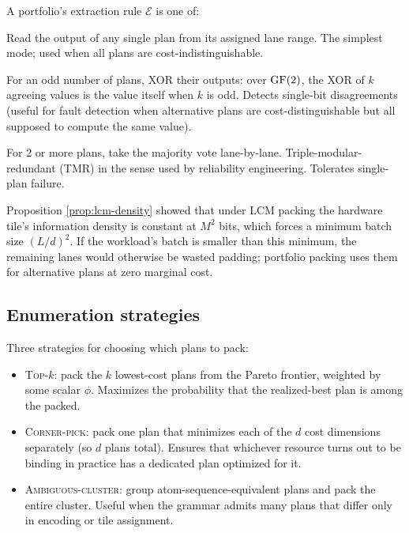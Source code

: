 \begin{definition}\label{def:extract}
  A portfolio's extraction rule $\mathcal{E}$ is
  one of:
  \begin{description}[nosep,leftmargin=1cm]
    \item[\textsc{First}] Read the output of any
      single plan from its assigned lane range. The
      simplest mode; used when all plans are
      cost-indistinguishable.
    \item[\textsc{XOR}] For an odd number of plans,
      XOR their outputs: over $\operatorname{GF}(2)$, the XOR of
      $k$ agreeing values is the value itself when
      $k$ is odd. Detects single-bit disagreements
      (useful for fault detection when alternative
      plans are cost-distinguishable but all
      supposed to compute the same value).
    \item[\textsc{Majority}] For 2 or more plans,
      take the majority vote lane-by-lane.
      Triple-modular-redundant (TMR) in the sense
      used by reliability engineering. Tolerates
      single-plan failure.
  \end{description}
\end{definition}

\begin{remark}
  Proposition \ref{prop:lcm-density} showed that
  under LCM packing the hardware tile's
  information density is constant at $M^2$ bits,
  which forces a minimum batch size $(L/d)^2$. If
  the workload's batch is smaller than this minimum,
  the remaining lanes would otherwise be wasted
  padding; portfolio packing uses them for
  alternative plans at zero marginal cost.
\end{remark}

\subsection{Enumeration strategies}

Three strategies for choosing which plans to pack:

\begin{itemize}[nosep]
  \item \textsc{Top-$k$}: pack the $k$ lowest-cost
    plans from the Pareto frontier, weighted by
    some scalar $\phi$. Maximizes the probability
    that the realized-best plan is among the
    packed.
  \item \textsc{Corner-pick}: pack one plan that
    minimizes each of the $d$ cost dimensions
    separately (so $d$ plans total). Ensures that
    whichever resource turns out to be binding in
    practice has a dedicated plan optimized for it.
  \item \textsc{Ambiguous-cluster}: group
    atom-sequence-equivalent plans and pack the
    entire cluster. Useful when the grammar admits
    many plans that differ only in encoding or
    tile assignment.
\end{itemize}

